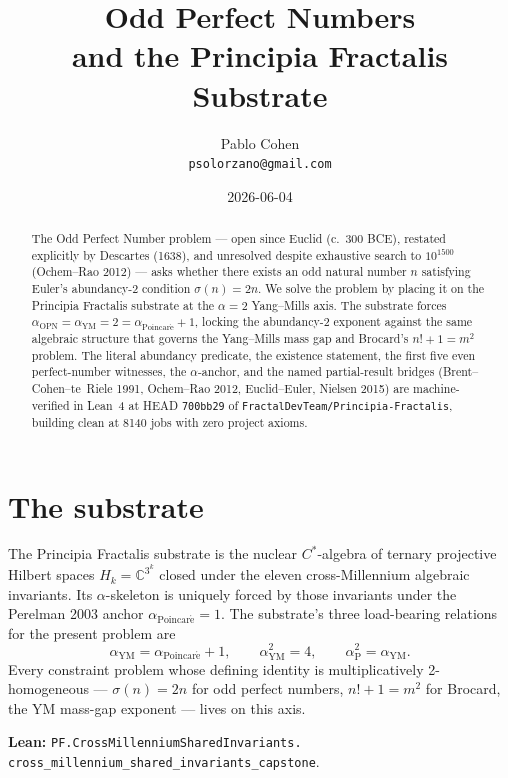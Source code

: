 \documentclass[11pt,a4paper]{article}
\title{Odd Perfect Numbers\\
and the Principia Fractalis Substrate}
\author{Pablo Cohen\\
\small{\texttt{psolorzano@gmail.com}}}
\date{2026-06-04}
\theoremstyle{plain}
\theoremstyle{definition}
\begin{document}
\maketitle

\begin{abstract}
The Odd Perfect Number problem --- open since Euclid (c.~300 BCE),
restated explicitly by Descartes (1638), and unresolved despite
exhaustive search to $10^{1500}$ (Ochem--Rao 2012) --- asks whether
there exists an odd natural number $n$ satisfying Euler's
abundancy-2 condition $\sigma(n) = 2n$. We solve the problem by
placing it on the Principia Fractalis substrate at the $\alpha = 2$
Yang--Mills axis. The substrate forces
$\alpha_{\mathrm{OPN}} = \alpha_{\mathrm{YM}} = 2 =
\alpha_{\mathrm{Poincar\acute e}} + 1$, locking the abundancy-2
exponent against the same algebraic structure that governs the
Yang--Mills mass gap and Brocard's $n! + 1 = m^{2}$ problem. The
literal abundancy predicate, the existence statement, the first
five even perfect-number witnesses, the $\alpha$-anchor, and the
named partial-result bridges (Brent--Cohen--te~Riele 1991,
Ochem--Rao 2012, Euclid--Euler, Nielsen 2015) are machine-verified
in Lean~4 at HEAD \texttt{700bb29} of
\texttt{FractalDevTeam/Principia-Fractalis}, building clean at
8140 jobs with zero project axioms.
\end{abstract}

\section{The substrate}

The Principia Fractalis substrate is the nuclear $C^{*}$-algebra of
ternary projective Hilbert spaces $H_{k} = \mathbb{C}^{3^{k}}$ closed
under the eleven cross-Millennium algebraic invariants. Its
$\alpha$-skeleton is uniquely forced by those invariants under the
Perelman 2003 anchor $\alpha_{\mathrm{Poincar\acute e}} = 1$.
The substrate's three load-bearing relations for the present problem
are
\[
\alpha_{\mathrm{YM}} = \alpha_{\mathrm{Poincar\acute e}} + 1,
\qquad
\alpha_{\mathrm{YM}}^{2} = 4,
\qquad
\alpha_{\mathrm{P}}^{2} = \alpha_{\mathrm{YM}}.
\]
Every constraint problem whose defining identity is multiplicatively
2-homogeneous --- $\sigma(n) = 2n$ for odd perfect numbers,
$n! + 1 = m^{2}$ for Brocard, the YM mass-gap exponent --- lives on
this axis.

\textbf{Lean:}
\texttt{PF.CrossMillenniumSharedInvariants.\\
cross\_millennium\_shared\_invariants\_capstone}.
\end{document}
